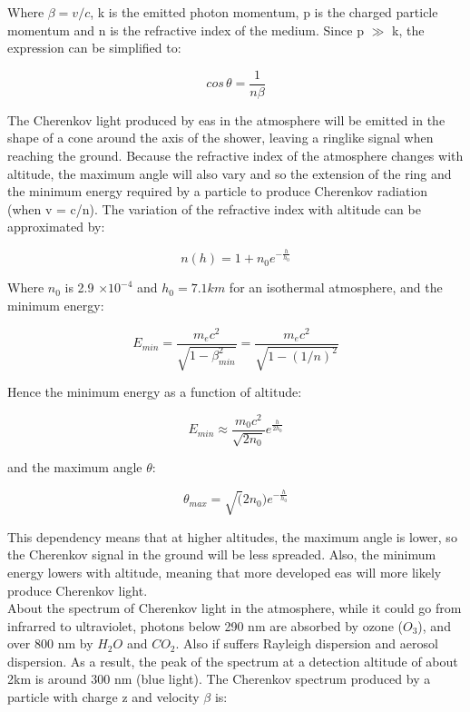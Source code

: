 \documentclass[main.tex]{subfiles}
\begin{document}
Where $\beta = v/c$, k is the emitted photon momentum, p is the charged particle momentum and n is the refractive index of the medium. Since p $\gg$ k, the expression can be simplified to:

\begin{equation}
    cos\,\theta = \frac{1}{n\beta}
\end{equation}

The Cherenkov light produced by \gls{eas} in the atmosphere will be emitted in the shape of a cone around the axis of the shower, leaving a ringlike signal when reaching the ground. Because the refractive index of the atmosphere changes with altitude, the maximum angle will also vary and so the extension of the ring and the minimum energy required by a particle to produce Cherenkov radiation (when v = c/n).
The variation of the refractive index with altitude can be approximated by:

\begin{equation}
    n(h) = 1+n_0e^{-\frac{h}{h_0}}
\end{equation}

Where $n_{0}$ is 2.9 $\times 10^{-4}$ and $h_0 = 7.1 km$ for an isothermal atmosphere, and the minimum energy:

\begin{equation}
    E_{min} = \frac{m_ec^2}{\sqrt{1-\beta_{min}^2}} = \frac{m_ec^2}{\sqrt{1-(1/n)^2}}
\end{equation}

Hence the minimum energy as a function of altitude:

\begin{equation}
    E_{min} \approx \frac{m_0c^2}{\sqrt{2n_0}}e^{\frac{h}{2h_0}}
\end{equation}

and the maximum angle $\theta$:

\begin{equation}
    \theta_{max} = \sqrt(2n_0)e^{-\frac{h}{h_0}}
\end{equation}

This dependency means that at higher altitudes, the maximum angle is lower, so the Cherenkov signal in the ground will be less spreaded. Also, the minimum energy lowers with altitude, meaning that more developed \gls{eas} will more likely produce Cherenkov light.\\
About the spectrum of Cherenkov light in the atmosphere, while it could go from infrarred to ultraviolet, photons below 290 nm are absorbed by ozone ($O_3$), and over 800 nm by $H_2O$ and $CO_2$. Also if suffers Rayleigh dispersion and aerosol dispersion. As a result, the peak of the spectrum at a detection altitude of about 2km is around 300 nm (blue light). The Cherenkov spectrum produced by a particle with charge z and velocity $\beta$ is:
\end{document}
